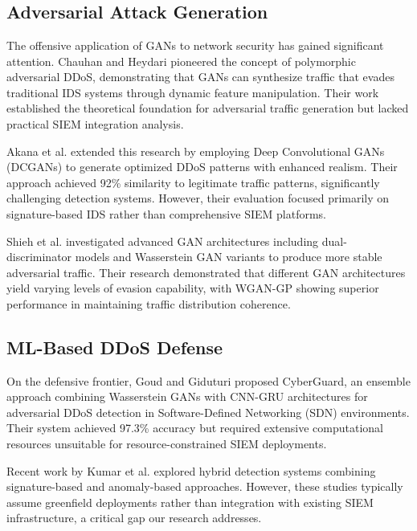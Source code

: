 \section{\chaptertwo}

\subsection{Adversarial Attack Generation}

The offensive application of GANs to network security has gained significant attention. Chauhan and Heydari \citep{chauhan2020} pioneered the concept of polymorphic adversarial DDoS, demonstrating that GANs can synthesize traffic that evades traditional IDS systems through dynamic feature manipulation. Their work established the theoretical foundation for adversarial traffic generation but lacked practical SIEM integration analysis.

Akana et al. \citep{akana2023} extended this research by employing Deep Convolutional GANs (DCGANs) to generate optimized DDoS patterns with enhanced realism. Their approach achieved 92\% similarity to legitimate traffic patterns, significantly challenging detection systems. However, their evaluation focused primarily on signature-based IDS rather than comprehensive SIEM platforms.

Shieh et al. \citep{shieh2022dual,shieh2021synthesis} investigated advanced GAN architectures including dual-discriminator models and Wasserstein GAN variants to produce more stable adversarial traffic. Their research demonstrated that different GAN architectures yield varying levels of evasion capability, with WGAN-GP showing superior performance in maintaining traffic distribution coherence.

\subsection{ML-Based DDoS Defense}

On the defensive frontier, Goud and Giduturi \citep{goud2024} proposed CyberGuard, an ensemble approach combining Wasserstein GANs with CNN-GRU architectures for adversarial DDoS detection in Software-Defined Networking (SDN) environments. Their system achieved 97.3\% accuracy but required extensive computational resources unsuitable for resource-constrained SIEM deployments.

Recent work by Kumar et al. \citep{kumar2021} explored hybrid detection systems combining signature-based and anomaly-based approaches. However, these studies typically assume greenfield deployments rather than integration with existing SIEM infrastructure, a critical gap our research addresses.

